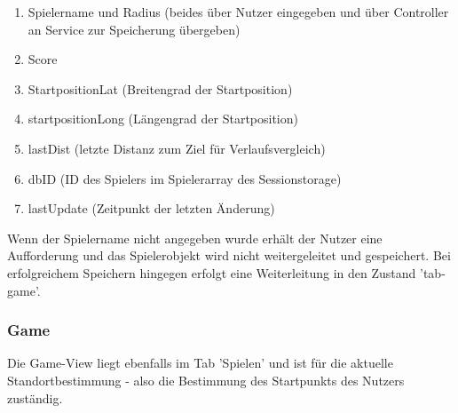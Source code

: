 \begin{enumerate}
\item Spielername und Radius (beides über Nutzer eingegeben und über Controller an Service zur Speicherung übergeben)
\item Score
\item StartpositionLat (Breitengrad der Startposition)
\item startpositionLong (Längengrad der Startposition)
\item lastDist (letzte Distanz zum Ziel für Verlaufsvergleich)
\item dbID (ID des Spielers im Spielerarray des Sessionstorage)
\item lastUpdate (Zeitpunkt der letzten Änderung)
\end{enumerate}
Wenn der Spielername nicht angegeben wurde erhält der Nutzer eine Aufforderung und das Spielerobjekt wird nicht weitergeleitet und gespeichert. Bei erfolgreichem Speichern hingegen erfolgt eine Weiterleitung in den Zustand 'tab-game'.
\subsubsection{Game}
Die Game-View liegt ebenfalls im Tab 'Spielen' und ist für die aktuelle Standortbestimmung - also die Bestimmung des Startpunkts des Nutzers zuständig.